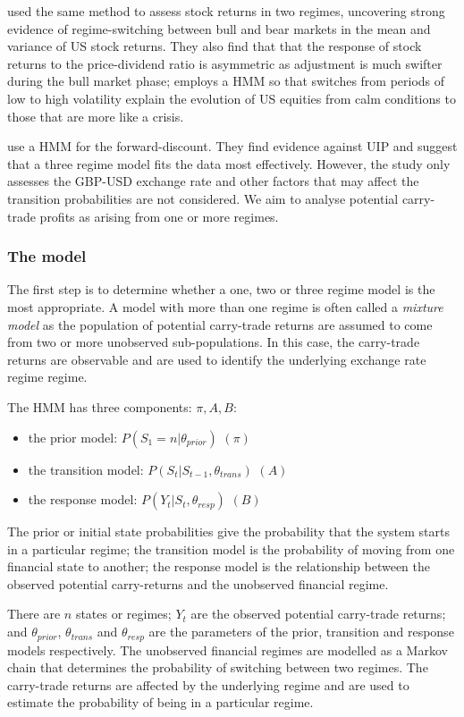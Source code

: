 \documentclass[12pt, a4paper, oneside]{article}\usepackage[]{graphicx}\usepackage[]{color}
\begin{document}
\citet{schaller1997regime} used the same method to assess stock returns in two regimes, uncovering strong evidence of regime-switching between bull and bear markets in the mean and variance of US stock returns.  They also find that that the response of stock returns to the price-dividend ratio is asymmetric as adjustment is much swifter during the bull market phase; \citet{dueker1997markov} employs a HMM so that switches from periods of low to high volatility explain the evolution of US equities from calm conditions to those that are more like a crisis.

\citet{Elliot} use a HMM for the forward-discount. They find evidence against UIP and suggest that a three regime model fits the data most effectively.  However, the study only assesses the GBP-USD exchange rate and other factors that may affect the transition probabilities are not considered.  We aim to analyse potential carry-trade profits as arising from one or more regimes.  

\subsubsection{The model}\label{secref:model}
The first step is to determine whether a one, two or three regime model is the most appropriate.  A  model with more than one regime is often called a \emph{mixture model} as the population of potential carry-trade returns are assumed to come from two or more unobserved sub-populations.  
 In this case, the carry-trade returns are observable and are used to identify the underlying exchange rate regime regime.  

The HMM has three components: $\pi, A, B$:

\begin{itemize}
\item the prior model: $P(S_1 = n| \theta_{prior})$ $(\pi)$
\item the transition model: $P(S_t| S_{t-1}, \theta_{trans})$ $(A)$
\item the response model: $P(Y_t| S_t, \theta_{resp})$ $(B)$
\end{itemize}

The prior or initial state probabilities give the probability that the system starts in a particular regime; the transition model is the probability of moving from one financial state to another; the response model is the relationship between the observed potential carry-returns and the unobserved financial regime.  

There are $n$ states or regimes; $Y_t$ are the observed potential carry-trade returns; and $\theta_{prior}$, $\theta_{trans}$ and  $\theta_{resp}$ are the parameters of the prior, transition and response models respectively. The unobserved financial regimes are modelled as a Markov chain that determines the probability of switching between two regimes.  The carry-trade returns are affected by the underlying regime and are used to estimate the probability of being in a particular regime.    
\end{document}
